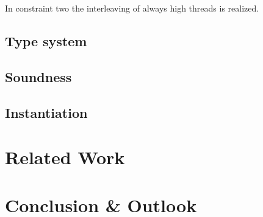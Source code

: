\documentclass[a4paper,10pt]{llncs}
\begin{document}
In constraint two the interleaving of always high threads is realized.

\subsection{Type system}
\label{sec:typesystem}
\subsection{Soundness}
\label{sec:soundness}
\subsection{Instantiation}
\label{sec:instantiation}

\section{Related Work}
\label{sec:relatedwork}
\section{Conclusion \& Outlook}
\label{sec:conclusion}


\end{document}
